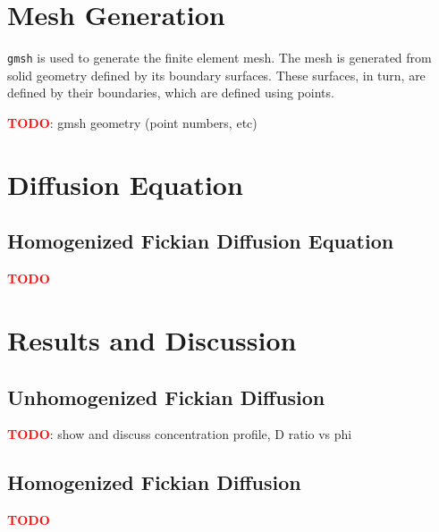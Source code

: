 \documentclass{article}
\begin{document}
\section{Mesh Generation}\label{sec:meshgen}

\texttt{gmsh} is used to generate the finite element mesh.
The mesh is generated from solid geometry defined by its boundary surfaces.
These surfaces, in turn, are defined by their boundaries,
which are defined using points.

\textcolor{red}{\textbf{TODO}}: gmsh geometry (point numbers, etc)



\section{Diffusion Equation}\label{sec:equation}



\subsection{Homogenized Fickian Diffusion Equation}\label{subsec:hom_fick}

\textcolor{red}{\textbf{TODO}}

\section{Results and Discussion}\label{sec:results}

\subsection{Unhomogenized Fickian Diffusion}\label{subsec:results_unhom_fick}

\textcolor{red}{\textbf{TODO}}: show and discuss concentration profile, D ratio vs phi

\subsection{Homogenized Fickian Diffusion}\label{subsec:results_hom_fick}

\textcolor{red}{\textbf{TODO}}
\end{document}
